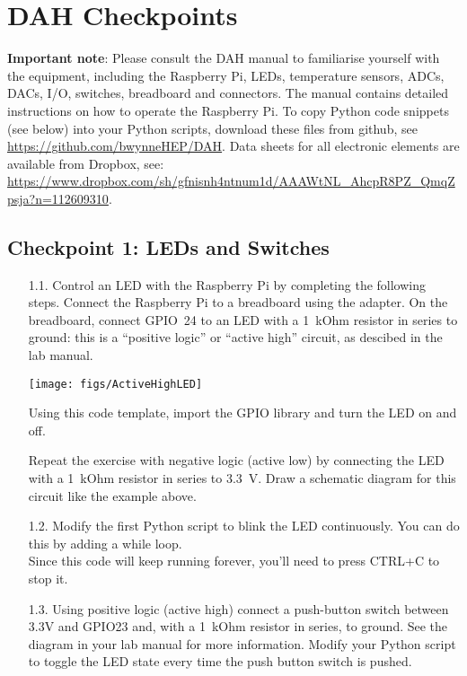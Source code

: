 \chapter{DAH Checkpoints}
\label{sec:checkpoints}
\vspace*{-0.99cm}
{\bf Important note}: Please consult the DAH manual to familiarise yourself with the equipment, including the Raspberry Pi, LEDs, temperature sensors, ADCs, DACs, I/O, switches, breadboard and connectors.
The manual contains detailed instructions on how to operate the Raspberry Pi.
To copy Python code snippets (see below) into your Python scripts, download these files from github, see \url{https://github.com/bwynneHEP/DAH}.
Data sheets for all electronic elements are available from Dropbox, see: \url{https://www.dropbox.com/sh/gfnisnh4ntnum1d/AAAWtNL_AhcpR8PZ_QmqZpsja?n=112609310}.  

\section{Checkpoint 1: LEDs and Switches}

\begin{enumerate}
\item [1.1.] Control an LED with the Raspberry Pi by completing the following steps.
Connect the Raspberry Pi to a breadboard using the adapter.
On the breadboard, connect GPIO~24 to an LED with a 1~kOhm resistor in series to ground: this is a ``positive logic'' or ``active high'' circuit, as descibed in the lab manual.

\vspace*{-3mm}
\begin{center}                                        
{\texttt{[image: figs/ActiveHighLED]}}
\end{center}

\newpage
Using this code template, import the GPIO library and turn the LED on and off.


Repeat the exercise with negative logic (active low) by connecting the LED with a 1~kOhm resistor in series to 3.3~V.
Draw a schematic diagram for this circuit like the example above.
 

\item [1.2.] Modify the first Python script to blink the LED continuously.
You can do this by adding a while loop. \\



Since this code will keep running forever, you'll need to press CTRL+C to stop it.
 

\item [1.3.] Using positive logic (active high) connect a push-button switch between 3.3V and GPIO23 and, with a 1~kOhm resistor in series, to ground.
See the diagram in your lab manual for more information.
Modify your Python script to toggle the LED state every time the push button switch is pushed. \\



\end{enumerate}

